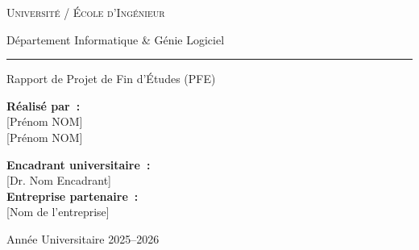 \documentclass[12pt,a4paper]{report}
\begin{document}
\setcounter{page}{1}

\begin{titlepage}
\centering
\vspace*{0.4cm}

{\large\scshape Université / École d'Ingénieur\par}
\vspace{0.2cm}
{\normalsize Département Informatique \& Génie Logiciel\par}
\vspace{0.3cm}
\noindent\rule{\linewidth}{1.5pt}
\vspace{0.3cm}

{\large Rapport de Projet de Fin d'Études (PFE)\par}
\vspace{0.8cm}


\vspace{1.2cm}

\begin{minipage}{0.45\textwidth}
\begin{flushleft}
\textbf{Réalisé par~:}\\[0.3cm]
\hspace{0.5cm}[Prénom NOM]\\
\hspace{0.5cm}[Prénom NOM]
\end{flushleft}
\end{minipage}
\hfill
\begin{minipage}{0.45\textwidth}
\begin{flushright}
\textbf{Encadrant universitaire~:}\\[0.2cm]
\hspace{0.5cm}[Dr. Nom Encadrant]\\[0.4cm]
\textbf{Entreprise partenaire~:}\\[0.2cm]
\hspace{0.5cm}[Nom de l'entreprise]
\end{flushright}
\end{minipage}

\vfill
{\large Année Universitaire 2025--2026\par}
\end{titlepage}
\end{document}
